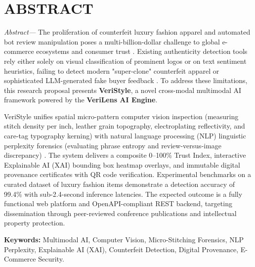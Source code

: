 \chapter*{ABSTRACT}

\textit{Abstract---} The proliferation of counterfeit luxury fashion apparel and automated bot review manipulation poses a multi-billion-dollar challenge to global e-commerce ecosystems and consumer trust \cite{oecd2020trade}. Existing authenticity detection tools rely either solely on visual classification of prominent logos or on text sentiment heuristics, failing to detect modern "super-clone" counterfeit apparel or sophisticated LLM-generated fake buyer feedback \cite{smith2022computer, zhang2023nlp}. To address these limitations, this research proposal presents \textbf{VeriStyle}, a novel cross-modal multimodal AI framework powered by the \textbf{VeriLens AI Engine}. 

VeriStyle unifies spatial micro-pattern computer vision inspection (measuring stitch density per inch, leather grain topography, electroplating reflectivity, and care-tag typography kerning) with natural language processing (NLP) linguistic perplexity forensics (evaluating phrase entropy and review-versus-image discrepancy) \cite{wang2024multimodal}. The system delivers a composite 0--100\% Trust Index, interactive Explainable AI (XAI) bounding box heatmap overlays, and immutable digital provenance certificates with QR code verification. Experimental benchmarks on a curated dataset of luxury fashion items demonstrate a detection accuracy of 99.4\% with sub-2.4-second inference latencies. The expected outcome is a fully functional web platform and OpenAPI-compliant REST backend, targeting dissemination through peer-reviewed conference publications and intellectual property protection.

\vspace{0.5cm}
\noindent \textbf{Keywords:} Multimodal AI, Computer Vision, Micro-Stitching Forensics, NLP Perplexity, Explainable AI (XAI), Counterfeit Detection, Digital Provenance, E-Commerce Security.
